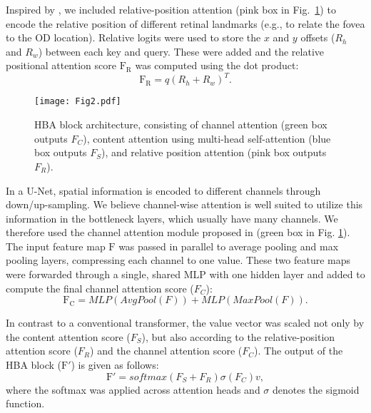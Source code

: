 \documentclass[hidelinks,runningheads]{llncs}
\begin{document}
Inspired by \cite{ramachandran_stand-alone_2019,srinivas_bottleneck_2021}, we included relative-position attention (pink box in Fig.~\ref{fig:MHSA-block}) to encode the relative position of different retinal landmarks (e.g., to relate the fovea to the \ac{OD} location).
Relative logits were used to store the $x$ and $y$ offsets ($R_h$ and $R_w$) between each key and query. These were added and the relative positional attention score $\mathrm{F_R}$ was computed using the dot product:\begin{equation} \label{eq:position}
    \mathrm{F_R} = q(R_h+R_w)^T.
\end{equation}
  




\begin{figure}[!t]
    \centering
    \texttt{[image: Fig2.pdf]}
    \caption{HBA block architecture, consisting of channel attention (green box outputs $F_C$), content attention using multi-head self-attention (blue box outputs $F_S$), and relative position attention (pink box outputs $F_R$).}
    \label{fig:MHSA-block}
\end{figure}

In a U-Net, spatial information is encoded to different channels through down/up-sampling. We believe channel-wise attention is well suited to utilize this information in the bottleneck layers, which usually have many channels. 
We therefore used the channel attention module proposed in \cite{DBLP:journals/corr/abs-1807-06521} (green box in Fig. \ref{fig:MHSA-block}).
The input feature map $\mathrm{F}$
was passed in parallel to average pooling and max pooling layers, compressing each channel to one value.
These two feature maps were forwarded through a single, shared \ac{MLP} with one hidden layer and added to compute the final channel attention score ($F_C$):\begin{equation} \label{eq:channel}
    \mathrm{F_C} = MLP(AvgPool(F)) + MLP(MaxPool(F)).
\end{equation}

In contrast to a conventional transformer, the value vector was scaled not only by the content attention score ($F_S$), but also according to the relative-position attention score ($F_R$) and the channel attention score ($F_C$). 
The output of the \Ac{HBA} block ($\mathrm{F'}$) is given as follows:
\begin{equation} \label{eq:hba}
    \mathrm{F'} = softmax(F_S+F_R)\sigma(F_C)v,
\end{equation}
where the softmax was applied across attention heads and $\sigma$ denotes the sigmoid function.
\end{document}
